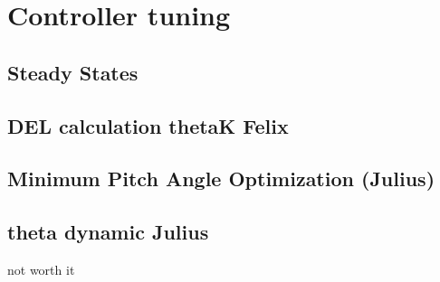 \chapter{Controller tuning}
\section{Steady States} \label{steady states}

\section{DEL calculation thetaK Felix}

\section{Minimum Pitch Angle Optimization (Julius)}


\section{theta dynamic Julius}
not worth it
